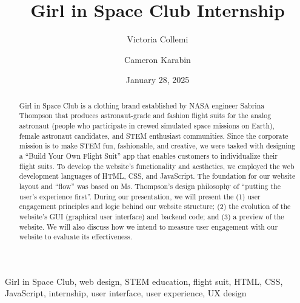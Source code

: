\documentclass[12pt,conference,onecolumn]{IEEEtran}
\title{Girl in Space Club Internship}
\author{Victoria Collemi \and Cameron Karabin}
\date{January 28, 2025}
\begin{document}
\maketitle 

\begin{abstract}
Girl in Space Club is a clothing brand established by NASA engineer Sabrina Thompson that produces astronaut-grade and fashion flight suits for the analog astronaut (people who participate in crewed simulated space missions on Earth), female astronaut candidates, and STEM enthusiast communities. Since the corporate mission is to make STEM fun, fashionable, and creative, we were tasked with designing a ``Build Your Own Flight Suit'' app that enables customers to individualize their flight suits. To develop the website's functionality and aesthetics, we employed the web development languages of HTML, CSS, and JavaScript. The foundation for our website layout and ``flow'' was based on Ms. Thompson’s design philosophy of ``putting the user’s experience first''. During our presentation, we will present the (1) user engagement principles and logic behind our website structure; (2) the evolution of the website's GUI (graphical user interface) and backend code; and (3) a preview of the website. We will also discuss how we intend to measure user engagement with our website to evaluate its effectiveness.
\end{abstract}

\begin{IEEEkeywords}
Girl in Space Club, web design, STEM education, flight suit, HTML, CSS, JavaScript, internship, user interface, user experience, UX design
\end{IEEEkeywords}
\end{document}
